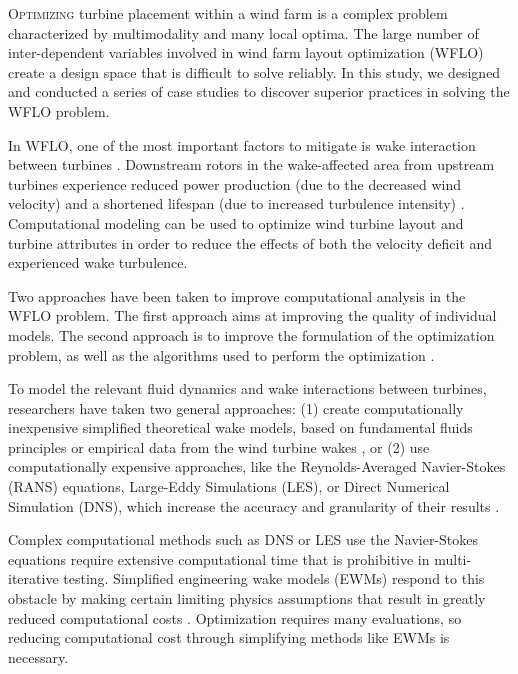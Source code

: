 

\lettrine[nindent=0pt]{O}{ptimizing} turbine placement within a wind farm is a complex problem characterized by multimodality and many local optima.
The large number of inter-dependent variables involved in wind farm layout optimization (WFLO) create a design space that is difficult to solve reliably.
In this study, we designed and conducted a series of case studies to discover superior practices in solving the WFLO problem.

In WFLO, one of the most important factors to mitigate is wake interaction between turbines \cite{HerbertAcero2014}.
Downstream rotors in the wake-affected area from upstream turbines experience reduced power production (due to the decreased wind velocity) and a shortened lifespan (due to increased turbulence intensity) \cite{Sanderse2009}.
Computational modeling can be used to optimize wind turbine layout and turbine attributes in order to reduce the effects of both the velocity deficit and experienced wake turbulence.

Two approaches have been taken to improve computational analysis in the WFLO problem.
The first approach aims at improving the quality of individual models.
The second approach is to improve the formulation of the optimization problem, as well as the algorithms used to perform the optimization \cite{Padron2018}.

To model the relevant fluid dynamics and wake interactions between turbines, researchers have taken two general approaches: (1) create  computationally inexpensive simplified theoretical wake models, based on fundamental fluids principles or empirical data from the wind turbine wakes \cite{Sanderse2009, Larsen2009, Vermeer2003}, or (2) use computationally expensive approaches, like the Reynolds-Averaged Navier-Stokes (RANS) equations, Large-Eddy Simulations (LES), or Direct Numerical Simulation (DNS), which increase the accuracy and granularity of their results \cite{Soren2011}.

Complex computational methods such as DNS or LES use the Navier-Stokes equations require extensive computational time that is prohibitive in multi-iterative testing.
Simplified engineering wake models (EWMs) respond to this obstacle by making certain limiting physics assumptions that result in greatly reduced computational costs \cite{HerbertAcero2014}.
Optimization requires many evaluations, so reducing computational cost through simplifying methods like EWMs is necessary.

